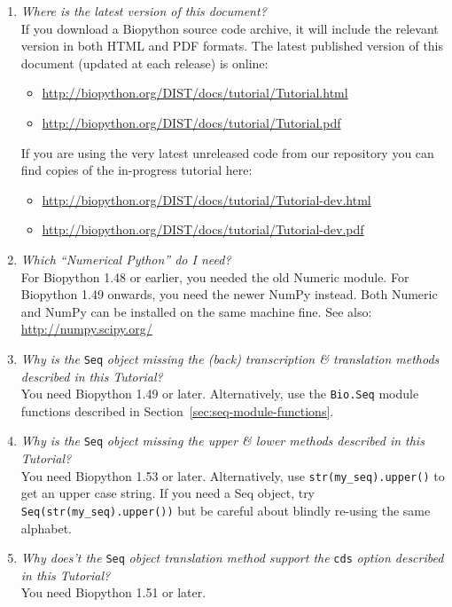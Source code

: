 \documentclass{report}
\begin{document}
\begin{enumerate}
  \item \emph{Where is the latest version of this document?}\\
  If you download a Biopython source code archive, it will include the
  relevant version in both HTML and PDF formats.  The latest published
  version of this document (updated at each release) is online:
  \begin{itemize}
  \item \url{http://biopython.org/DIST/docs/tutorial/Tutorial.html}
  \item \url{http://biopython.org/DIST/docs/tutorial/Tutorial.pdf}
  \end{itemize}
  If you are using the very latest unreleased code from our repository
  you can find copies of the in-progress tutorial here:
  \begin{itemize}
  \item \url{http://biopython.org/DIST/docs/tutorial/Tutorial-dev.html}
  \item \url{http://biopython.org/DIST/docs/tutorial/Tutorial-dev.pdf}
  \end{itemize}
  
  \item \emph{Which ``Numerical Python'' do I need?} \\
  For Biopython 1.48 or earlier, you needed the old Numeric module.
  For Biopython 1.49 onwards, you need the newer NumPy instead.
  Both Numeric and NumPy can be installed on the same machine fine.
  See also: \url{http://numpy.scipy.org/}

  \item \emph{Why is the} \verb|Seq| \emph{object missing the (back) transcription \& translation methods described in this Tutorial?} \\
  You need Biopython 1.49 or later.  Alternatively, use the \verb|Bio.Seq| module functions described in Section~\ref{sec:seq-module-functions}.

  \item \emph{Why is the} \verb|Seq| \emph{object missing the upper \& lower methods described in this Tutorial?} \\
  You need Biopython 1.53 or later.  Alternatively, use \verb|str(my_seq).upper()| to get an upper case string.
  If you need a Seq object, try \verb|Seq(str(my_seq).upper())| but be careful about blindly re-using the same alphabet.
 
  \item \emph{Why does't the} \verb|Seq| \emph{object translation method support the} \verb|cds| \emph{option described in this Tutorial?} \\
  You need Biopython 1.51 or later.


\end{enumerate}
\end{document}

